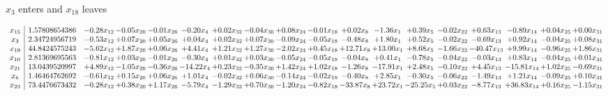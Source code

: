 \documentclass[9pt]{article}
\begin{document}
 $ x_{3} $ enters and $ x_{18} $ leaves 

 \[\begin{array}{c| c c@{\hskip 2pt} c@{\hskip 2pt} c@{\hskip 2pt} c@{\hskip 2pt} c@{\hskip 2pt} c@{\hskip 2pt} c@{\hskip 2pt} c@{\hskip 2pt} c@{\hskip 2pt} c@{\hskip 2pt} c@{\hskip 2pt} c@{\hskip 2pt} c@{\hskip 2pt} c@{\hskip 2pt} c@{\hskip 2pt} c@{\hskip 2pt} }
 x_{15}   &  1.57808654386 & -0.28 x_{12} & -0.05 x_{20} & -0.01 x_{26} & -0.20 x_{4} & +  0.02 x_{32} & -0.04 x_{30} & +  0.08 x_{24} & -0.01 x_{18} & +  0.02 x_{8} & -1.36 x_{1} & +  0.39 x_{5} & -0.02 x_{22} & +  0.63 x_{13} & -0.89 x_{14} & +  0.04 x_{25} & +  0.00 x_{31}\\
 x_{3}   &  2.34724956719 & -0.53 x_{12} & +  0.07 x_{20} & +  0.05 x_{26} & +  0.04 x_{4} & +  0.02 x_{32} & +  0.07 x_{30} & -0.09 x_{24} & -0.05 x_{18} & -0.48 x_{8} & +  1.80 x_{1} & +  0.52 x_{5} & -0.02 x_{22} & -0.69 x_{13} & +  0.92 x_{14} & -0.04 x_{25} & +  0.08 x_{31}\\
 x_{19}   &  44.8424575243 & -5.62 x_{12} & +  1.87 x_{20} & +  0.06 x_{26} & +  4.41 x_{4} & +  1.21 x_{32} & +  1.27 x_{30} & -2.02 x_{24} & +  0.45 x_{18} & + 12.71 x_{8} & + 13.00 x_{1} & +  8.68 x_{5} & -1.66 x_{22} & -40.47 x_{13} & +  9.99 x_{14} & -0.96 x_{25} & +  1.86 x_{31}\\
 x_{10}   &  2.81369695563 & -0.81 x_{12} & +  0.03 x_{20} & -0.01 x_{26} & -0.30 x_{4} & +  0.01 x_{32} & +  0.03 x_{30} & -0.05 x_{24} & -0.05 x_{18} & -0.04 x_{8} & +  0.41 x_{1} & -0.78 x_{5} & -0.04 x_{22} & -0.03 x_{13} & +  0.83 x_{14} & -0.04 x_{25} & +  0.01 x_{31}\\
 x_{21}   &  13.0439520997 & +  4.89 x_{12} & -1.05 x_{20} & -0.36 x_{26} & -14.22 x_{4} & +  0.23 x_{32} & -0.35 x_{30} & +  1.42 x_{24} & +  1.02 x_{18} & -1.26 x_{8} & -17.91 x_{1} & +  2.48 x_{5} & -0.10 x_{22} & +  4.45 x_{13} & -15.81 x_{14} & +  1.02 x_{25} & -0.69 x_{31}\\
 x_{6}   &  1.46464762692 & -0.61 x_{12} & +  0.15 x_{20} & +  0.06 x_{26} & +  1.01 x_{4} & -0.02 x_{32} & +  0.06 x_{30} & -0.14 x_{24} & -0.02 x_{18} & -0.40 x_{8} & +  2.85 x_{1} & -0.30 x_{5} & -0.06 x_{22} & -1.49 x_{13} & +  1.21 x_{14} & -0.09 x_{25} & +  0.10 x_{31}\\
 x_{23}   &  73.4476673432 & -0.28 x_{12} & +  0.38 x_{20} & +  1.17 x_{26} & -5.79 x_{4} & -1.29 x_{32} & +  0.70 x_{30} & -1.20 x_{24} & -0.82 x_{18} & -33.87 x_{8} & + 23.72 x_{1} & -25.25 x_{5} & +  0.03 x_{22} & -8.77 x_{13} & + 36.83 x_{14} & +  0.16 x_{25} & -1.15 x_{31}\\

\end{array}\]
\end{document}
